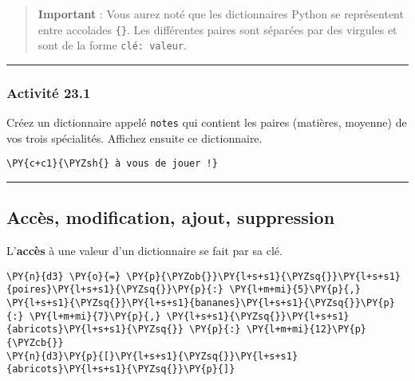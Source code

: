 \documentclass[12pt]{book}
\begin{document}
    \begin{quote}
\textbf{Important} : Vous aurez noté que les dictionnaires Python se
représentent entre accolades \texttt{\{\}}. Les différentes paires sont
séparées par des virgules et sont de la forme \texttt{clé:\ valeur}.
\end{quote}

    \begin{center}\rule{0.5\linewidth}{0.5pt}\end{center}

\hypertarget{activituxe9-23.1}{%
\subsubsection{Activité 23.1}\label{activituxe9-23.1}}

Créez un dictionnaire appelé \texttt{notes} qui contient les paires
(matières, moyenne) de vos trois spécialités. Affichez ensuite ce
dictionnaire.

    \begin{tcolorbox}[breakable, size=fbox, boxrule=1pt, pad at break*=1mm,colback=cellbackground, colframe=cellborder]
\begin{Verbatim}[commandchars=\\\{\}]
\PY{c+c1}{\PYZsh{} à vous de jouer !}
\end{Verbatim}
\end{tcolorbox}

    \begin{center}\rule{0.5\linewidth}{0.5pt}\end{center}

\hypertarget{accuxe8s-modification-ajout-suppression}{%
\subsection{Accès, modification, ajout,
suppression}\label{accuxe8s-modification-ajout-suppression}}

L'\textbf{accès} à une valeur d'un dictionnaire se fait par sa clé.

    \begin{tcolorbox}[breakable, size=fbox, boxrule=1pt, pad at break*=1mm,colback=cellbackground, colframe=cellborder]
\begin{Verbatim}[commandchars=\\\{\}]
\PY{n}{d3} \PY{o}{=} \PY{p}{\PYZob{}}\PY{l+s+s1}{\PYZsq{}}\PY{l+s+s1}{poires}\PY{l+s+s1}{\PYZsq{}}\PY{p}{:} \PY{l+m+mi}{5}\PY{p}{,} \PY{l+s+s1}{\PYZsq{}}\PY{l+s+s1}{bananes}\PY{l+s+s1}{\PYZsq{}}\PY{p}{:} \PY{l+m+mi}{7}\PY{p}{,} \PY{l+s+s1}{\PYZsq{}}\PY{l+s+s1}{abricots}\PY{l+s+s1}{\PYZsq{}} \PY{p}{:} \PY{l+m+mi}{12}\PY{p}{\PYZcb{}}
\PY{n}{d3}\PY{p}{[}\PY{l+s+s1}{\PYZsq{}}\PY{l+s+s1}{abricots}\PY{l+s+s1}{\PYZsq{}}\PY{p}{]}
\end{Verbatim}
\end{tcolorbox}
\end{document}
